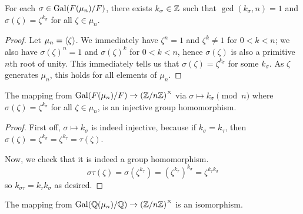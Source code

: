 \begin{lemma}
    For each \(\sigma \in \operatorname{Gal}(F(\mu_n)/F)\),
    there exists \(k_\sigma \in \mathbb{Z}\) such that \(\gcd(k_\sigma,n) = 1\)
    and \(\sigma(\zeta) = \zeta^{k_\sigma}\) for all \(\zeta \in \mu_n\).
\end{lemma}
\begin{proof}
    Let \(\mu_n = \left\langle\zeta\right\rangle\).
    We immediately have \(\zeta^n = 1\) and \(\zeta^k \neq 1\) for \(0 < k < n\);
    we also have \({\sigma(\zeta)}^n = 1\) and \({\sigma(\zeta)}^k\) for \(0 < k < n\),
    hence \(\sigma(\zeta)\) is also a primitive \(n\)th root of unity.
    This immediately tells us that \(\sigma(\zeta) = \zeta^{k_\sigma}\) for some \(k_\sigma\).
    As \(\zeta\) generates \(\mu_n\), this holds for all elements of \(\mu_n\).
\end{proof}
\begin{theorem}\label{thm:cyclotomic-injective}
    The mapping from \(\operatorname{Gal}(F(\mu_n)/F) \to {(\mathbb{Z}/n\mathbb{Z})}^\times\)
    via \(\sigma \mapsto k_\sigma \pmod{n}\)
    where \(\sigma(\zeta) = \zeta^{k_\sigma}\) for all \(\zeta \in \mu_n\),
    is an injective group homomorphism.
\end{theorem}
\begin{proof}
    First off, \(\sigma \mapsto k_\sigma\) is indeed injective,
    because if \(k_\sigma = k_\tau\), then \(\sigma(\zeta) = \zeta^{k_\sigma} = \zeta^{k_\tau} = \tau(\zeta)\).

    Now, we check that it is indeed a group homomorphism.
    \begin{equation*}
        \sigma\tau(\zeta) = \sigma(\zeta^{k_\tau}) = {(\zeta^{k_\tau})}^{k_\sigma} = \zeta^{k_\tau k_\sigma}
    \end{equation*}
    so \(k_{\sigma\tau} = k_\tau k_\sigma\) as desired.
\end{proof}
\begin{theorem}\label{thm:cyclotomic-isomorphism}
    The mapping from \(\operatorname{Gal}(\mathbb{Q}(\mu_n)/\mathbb{Q}) \to {(\mathbb{Z}/n\mathbb{Z})}^\times\) is an isomorphism.
\end{theorem}

